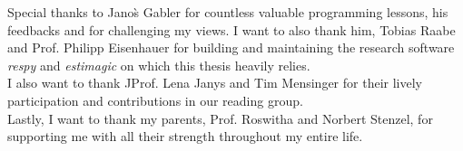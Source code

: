 \noindent
Special thanks to Jano\`{s} Gabler for countless valuable programming lessons, his feedbacks and for challenging my views. I want to also thank him, Tobias Raabe and Prof. Philipp Eisenhauer for building and maintaining the research software \textit{respy} and \textit{estimagic} on which this thesis heavily relies.\\

\noindent
I also want to thank JProf. Lena Janys and Tim Mensinger for their lively participation and contributions in our reading group.\\

\noindent
Lastly, I want to thank my parents, Prof. Roswitha and Norbert Stenzel, for supporting me with all their strength throughout my entire life.


\newpage